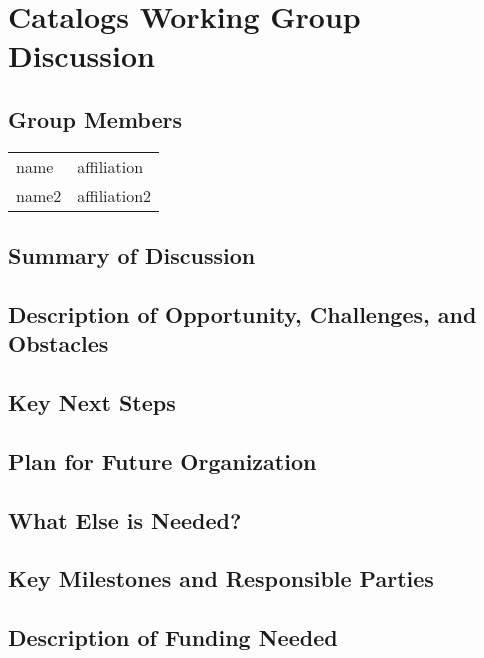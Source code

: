 \section{Catalogs Working Group Discussion}
\label{sec:appendix_catalogs}

\subsection{Group Members}
{\small
\begin{longtable}{ll}
   name            &  affiliation
\\ name2           &  affiliation2
\end{longtable}
}

\subsection{Summary of Discussion}

\subsection{Description of Opportunity, Challenges, and Obstacles}


\subsection{Key Next Steps}


\subsection{Plan for Future Organization}


\subsection{What Else is Needed?}


\subsection{Key Milestones and Responsible Parties}


\subsection{Description of Funding Needed}
